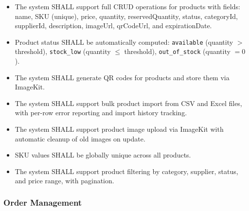 \documentclass[12pt,onecolumn]{IEEEtran}
\begin{document}
\begin{tcolorbox}[reqbox,title={FR-PROD: Product Requirements}]
\begin{itemize}[leftmargin=1.5em]
  \item {} The system SHALL support full CRUD operations for products with fields: name, SKU (unique), price, quantity, reservedQuantity, status, categoryId, supplierId, description, imageUrl, qrCodeUrl, and expirationDate.
  \item {} Product status SHALL be automatically computed: \texttt{available} (quantity $>$ threshold), \texttt{stock\_low} (quantity $\leq$ threshold), \texttt{out\_of\_stock} (quantity $= 0$).
  \item {} The system SHALL generate QR codes for products and store them via ImageKit.
  \item {} The system SHALL support bulk product import from CSV and Excel files, with per-row error reporting and import history tracking.
  \item {} The system SHALL support product image upload via ImageKit with automatic cleanup of old images on update.
  \item {} SKU values SHALL be globally unique across all products.
  \item {} The system SHALL support product filtering by category, supplier, status, and price range, with pagination.
\end{itemize}
\end{tcolorbox}

\subsubsection{Order Management}
\end{document}
